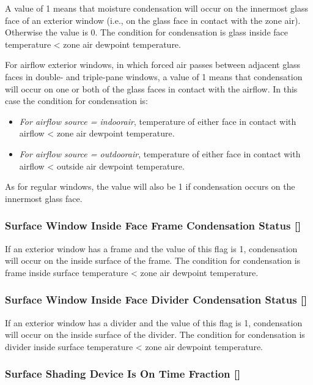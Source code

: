 A value of 1 means that moisture condensation will occur on the innermost glass face of an exterior window (i.e., on the glass face in contact with the zone air). Otherwise the value is 0. The condition for condensation is glass inside face temperature \textless{} zone air dewpoint temperature.

For airflow exterior windows, in which forced air passes between adjacent glass faces in double- and triple-pane windows, a value of 1 means that condensation will occur on one or both of the glass faces in contact with the airflow. In this case the condition for condensation is:

\begin{itemize}
\item
  \emph{For airflow source = indoorair}, temperature of either face in contact with airflow \textless{} zone air dewpoint temperature.
\item
  \emph{For airflow source = outdoorair}, temperature of either face in contact with airflow \textless{} outside air dewpoint temperature.
\end{itemize}

As for regular windows, the value will also be 1 if condensation occurs on the innermost glass face.

\subsubsection{Surface Window Inside Face Frame Condensation Status {[]}}\label{surface-window-inside-face-frame-condensation-status}

If an exterior window has a frame and the value of this flag is 1, condensation will occur on the inside surface of the frame. The condition for condensation is frame inside surface temperature \textless{} zone air dewpoint temperature.

\subsubsection{Surface Window Inside Face Divider Condensation Status {[]}}\label{surface-window-inside-face-divider-condensation-status}

If an exterior window has a divider and the value of this flag is 1, condensation will occur on the inside surface of the divider. The condition for condensation is divider inside surface temperature \textless{} zone air dewpoint temperature.

\subsubsection{Surface Shading Device Is On Time Fraction {[]}}\label{surface-shading-device-is-on-time-fraction}

